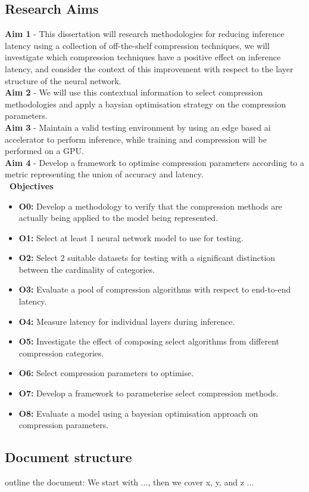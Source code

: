 \documentclass[../D1.tex]{subfiles}
\begin{document}
\subsection{Research Aims}
\textbf{Aim 1}\label{Aim1} - This dissertation will research methodologies for reducing inference latency using a collection of off-the-shelf compression techniques, we will investigate which compression techniques have a positive effect on inference latency, and consider the context of this improvement with respect to the layer structure of the neural network.\\ 
\noindent\textbf{Aim 2}\label{Aim2} - We will use this contextual information to select compression methodologies and apply a baysian optimisation strategy on the compression parameters.\\
\noindent\textbf{Aim 3}\label{Aim3} - Maintain a valid testing environment by using an edge based ai accelerator to perform inference, while training and compression will be performed on a GPU.\\
\noindent\textbf{Aim 4}\label{Aim4} - Develop a framework to optimise compression parameters according to a metric representing the union of accuracy and latency.\\
\textbf{\large~Objectives}
\begin{itemize}
    \item \textbf{O0:}\label{obj:VerifyComp} Develop a methodology to verify that the compression methods are actually being applied to the model being represented.
    \item \textbf{O1:}\label{obj:ModelSel} Select at least 1 neural network model to use for testing.
    \item \textbf{O2:}\label{obj:DataSel} Select 2 suitable datasets for testing with a significant distinction between the cardinality of categories.
    \item \textbf{O3:}\label{obj:EvalE2E} Evaluate a pool of compression algorithms with respect to end-to-end latency.
    \item \textbf{O4:}\label{obj:EvalLayer} Measure latency for individual layers during inference.
    \item \textbf{O5:}\label{obj:EvalComp} Investigate the effect of composing select algorithms from different compression categories. 
    \item \textbf{O6:}\label{obj:ParaSel} Select compression parameters to optimise.
    \item \textbf{O7:}\label{obj:CompPara} Develop a framework to parameterise select compression methods.
    \item \textbf{O8:}\label{obj:TestOpt} Evaluate a model using a bayesian optimisation approach on compression parameters.
\end{itemize}

\subsection{Document structure}

outline the document: We start with ..., then we cover x, y, and z ...
\end{document}
